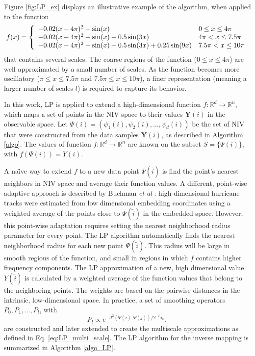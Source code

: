 \documentclass[aip,jcp,preprint]{revtex4-1}
\begin{document}
\begin{widetext}
Figure \ref{fig:LP_ex} displays an illustrative example of the algorithm, when applied to the function
 \begin{equation} \label{eq:LP_example}
f(x) = \left\{
\begin{array}{l l}
-0.02(x-4\pi)^2 + \sin(x) &  0 \le x \le 4\pi \\
-0.02(x-4\pi)^2 + \sin(x) + 0.5 \sin(3x) &  4\pi < x \le 7.5 \pi \\
-0.02(x-4\pi)^2 + \sin(x) + 0.5 \sin(3x) +0.25 \sin(9x) &  7.5 \pi < x \le 10 \pi
\end{array}
\right.
\end{equation}
that contains several scales.
%
The coarse regions of the function ($0 \le x \le 4\pi$) are well approximated by a small number of scales.
%
As the function becomes more oscillatory ($\pi \le x \le 7.5\pi$ and $7.5\pi \le x \le 10\pi$),
a finer representation (meaning a larger number of scales  $l$) is required to capture its behavior.
\end{widetext}

In this work, LP is applied to extend a high-dimensional function $f:\mathbb{R}^d \rightarrow \mathbb{R}^n$,
which maps a set of points in the NIV space to their values $\mathbf{Y}(i)$ in the observable space.
%
Let $\Psi(i) = \left(\psi_1(i),\psi_2(i),\ldots,\psi_d(i)\right)$ be the set of NIV that were constructed from the data samples $\mathbf{Y}(i)$, as described in Algorithm \ref{algo}.
%
The values of function $f:\mathbb{R}^d \rightarrow \mathbb{R}^n$ are known on the subset $S = \{\Psi(i)\}$, with $f(\Psi(i)) = Y(i)$.

A na\"{\i}ve way to extend $f$ to a new data point $\Psi(\tilde{i})$ is find the point's nearest neighbors in NIV space and average their function values.
%
A different, point-wise adaptive approach is described by Buchman {\em et al} \cite{buchman2011high}:
high-dimensional hurricane tracks were estimated from low dimensional embedding coordinates using a weighted average of the points close to $\Psi(\tilde{i})$ in the embedded space.
%
However, this point-wise adaptation requires setting the nearest neighborhood radius parameter for every point.
%
The LP algorithm automatically finds the nearest neighborhood radius for each new point $\Psi(\tilde{i})$.
%
This radius will be large in smooth regions of the function, and small in regions in which $f$ contains higher frequency components.
%
The LP approximation of a new, high dimensional value $Y(\tilde{i})$ is calculated by a weighted average of the function values that belong to the neighboring points.
%
The weights are based on the pairwise distances in the intrinsic, low-dimensional space.
%
In practice, a set of smoothing operators $P_0, P_1, \ldots, P_l$, with
\begin{equation} \label{eq:LP_multi_scale_app}
P_l \propto e^{-d^2(\Psi(i),\Psi(j)) / 2^{-l} \sigma_0},
\end{equation}
are constructed and later extended to create the multiscale approximations as defined in Eq. \ref{eq:LP_multi_scale}.
%
The LP algorithm for the inverse mapping is summarized in Algorithm \ref{algo_LP}.
\end{document}
